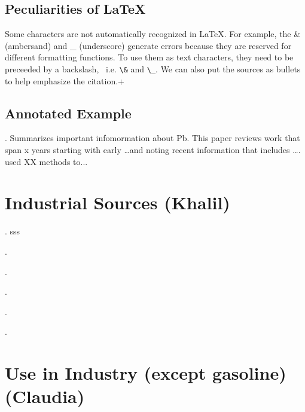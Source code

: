 \documentclass{article}
\begin{document}
\subsection{Peculiarities of \LaTeX}

Some characters are not automatically recognized in \LaTeX. For example, the \& (ambersand) and \_ (underscore) generate errors because they are reserved for different formatting functions. To use them as text characters, they need to be preceeded by a backslash, \, i.e. \verb!\&! and \verb!\_!.  We can also put the sources as bullets to help emphasize the citation.+

\subsection{Annotated Example}

\bigskip
\noindent {}.  Summarizes important infomormation about Pb. This paper reviews work that span x years starting with early \ldots and noting recent information that includes \ldots. \cite{Barltrop1975absorption} used XX methods to...

\section{Industrial Sources (Khalil)}

. sss

.

.

.

. 

. 

\section{Use in Industry (except gasoline) (Claudia)}


\end{document}
